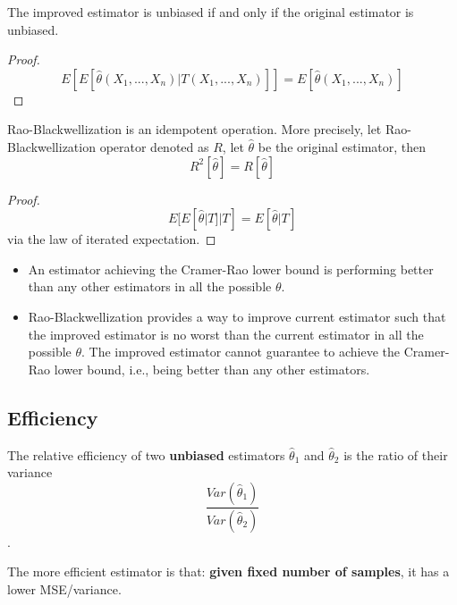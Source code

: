 \begin{refsection}
\begin{lemma}
	The improved estimator is unbiased if and only if the original estimator is unbiased. 	
\end{lemma}
\begin{proof}
	$$E[E[\hat{\theta}(X_1,...,X_n)|T(X_1,...,X_n)]]=E[\hat{\theta}(X_1,...,X_n)]$$
\end{proof}


\begin{lemma}
	Rao-Blackwellization is an idempotent operation. More precisely, let Rao-Blackwellization operator denoted as $R$, let $\hat{\theta}$ be the original estimator, then
	$$R^2[\hat{\theta}] = R[\hat{\theta}]$$	
\end{lemma}
\begin{proof}
	$$E[E[\hat{\theta}|T]|T]=E[\hat{\theta}|T]$$
	via the law of iterated expectation.
\end{proof}


\begin{remark}\hfill
	\begin{itemize}
		\item An estimator achieving the Cramer-Rao lower bound is performing better than any other estimators in all the possible $\theta$.
		\item Rao-Blackwellization provides a way to improve current estimator such that the improved estimator is no worst than the current estimator in all the possible $\theta$. The improved estimator cannot guarantee to achieve the Cramer-Rao lower bound, i.e., being better than any other estimators. 
	\end{itemize}
\end{remark}



\subsection{Efficiency}

\begin{definition}
	The relative efficiency of two \textbf{unbiased} estimators $\hat{\theta}_1$ and $\hat{\theta}_2$ is the ratio of their variance $$\frac{Var(\hat{\theta}_1)}{Var(\hat{\theta}_2)}$$.
\end{definition}

\begin{remark}
	The more efficient estimator is that: \textbf{given fixed number of samples}, it has a lower MSE/variance. 
\end{remark}





\end{refsection}
